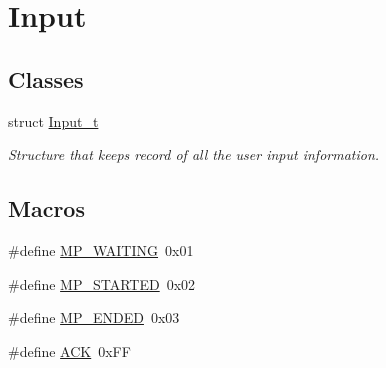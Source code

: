 \hypertarget{group___input}{}\section{Input}
\label{group___input}
\subsection*{Classes}
\begin{DoxyCompactItemize}
\item 
struct \hyperlink{struct_input__t}{Input\+\_\+t}
\begin{DoxyCompactList}\small\item\em Structure that keeps record of all the user input information. \end{DoxyCompactList}\end{DoxyCompactItemize}
\subsection*{Macros}
\begin{DoxyCompactItemize}
\item 
\#define \hyperlink{group___input_ga1d7797eb18d53b8e2b78e4255bee6050}{M\+P\+\_\+\+W\+A\+I\+T\+I\+NG}~0x01
\item 
\#define \hyperlink{group___input_ga67d21ae11c5f3ce5f1445b40f7455731}{M\+P\+\_\+\+S\+T\+A\+R\+T\+ED}~0x02
\item 
\#define \hyperlink{group___input_gabf5d93e2b77034df4441eb3e448bfb95}{M\+P\+\_\+\+E\+N\+D\+ED}~0x03
\item 
\#define \hyperlink{group___input_ga6f6489887e08bff4887d0bc5dcf214d8}{A\+CK}~0x\+FF
\end{DoxyCompactItemize}
